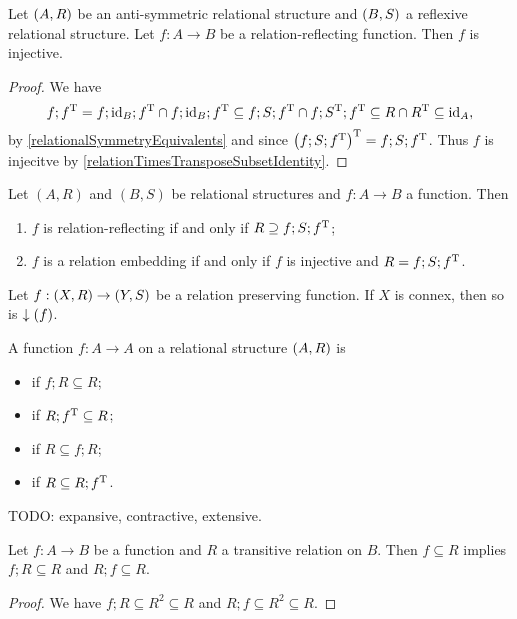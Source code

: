 \begin{lemma}
Let $\sSet{A, R}$ be an anti-symmetric relational structure and $\sSet{B, S}$ a reflexive relational structure. Let $f:A\to B$ be a relation-reflecting function. Then $f$ is injective.
\end{lemma}
\begin{proof}
We have
\[ f;f^{\mathrm{T}} = f;\operatorname{id}_B;f^{\mathrm{T}} \cap f;\operatorname{id}_B;f^{\mathrm{T}} \subseteq f;S;f^{\mathrm{T}} \cap f;S^{\mathrm{T}};f^{\mathrm{T}} \subseteq R\cap R^{\mathrm{T}} \subseteq \operatorname{id}_A, \]
by \ref{relationalSymmetryEquivalents} and since $\big(f;S;f^{\mathrm{T}}\big)^{\mathrm{T}} = f;S;f^{\mathrm{T}}$. Thus $f$ is injecitve by \ref{relationTimesTransposeSubsetIdentity}.
\end{proof}

\begin{lemma}
Let $(A, R)$ and $(B, S)$ be relational structures and $f: A\to B$ a function. Then
\begin{enumerate}
\item $f$ is relation-reflecting \textup{if and only if} $R \supseteq f;S;f^{\mathrm{T}}$;
\item $f$ is a relation embedding \textup{if and only if} $f$ is injective and $R = f;S;f^{\mathrm{T}}$.
\end{enumerate}
\end{lemma}

\begin{lemma} \label{connexityImage}
Let $f: \sSet{X,R} \to \sSet{Y,S}$ be a relation preserving function. If $X$ is connex, then so is $\downarrow(f)$.
\end{lemma}

\begin{definition}
A function $f: A\to A$ on a relational structure $\sSet{A, R}$ is
\begin{itemize}
\item {} if $f;R \subseteq R$;
\item {} if $R;f^{\mathrm{T}} \subseteq R$;
\item {} if $R \subseteq f;R$;
\item {} if $R \subseteq R;f^{\mathrm{T}}$.
\end{itemize}
\end{definition}

TODO: expansive, contractive, extensive.

\begin{lemma} \label{transitiveRestrictiveLemma}
Let $f: A\to B$ be a function and $R$ a transitive relation on $B$. Then $f\subseteq R$ implies $f;R\subseteq R$ and $R;f\subseteq R$.
\end{lemma}
\begin{proof}
We have $f;R\subseteq R^2 \subseteq R$ and $R;f \subseteq R^2 \subseteq R$.
\end{proof}

